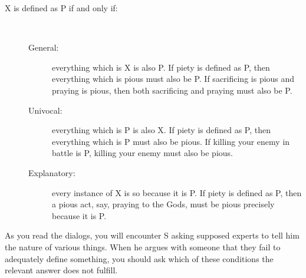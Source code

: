 \documentclass[oneside]{article}
\begin{document}
\begin{description}
\item[ X is defined as P if and only if:]\
\begin{description}
\item[General:] everything which is X is also P. If piety is defined as P, then everything which is pious must also be P. If sacrificing is pious and praying is pious, then both sacrificing and praying must also be P. 
\item[Univocal:] everything which is P is also X. If piety is defined as P, then everything which is P must also be pious. If killing your enemy in battle is P, killing your enemy must also be pious. 
\item[Explanatory:]  every instance of X is so because it is P. If piety is defined as P, then a pious act, say, praying to the Gods, must be pious precisely because it is P. 
\end{description}
\end{description}
\noindent As you read the dialogs, you will encounter S asking supposed experts to tell him the nature of various things. When he argues with someone that they fail to adequately define something, you should ask which of these conditions the relevant answer does not fulfill. 




\end{document}
